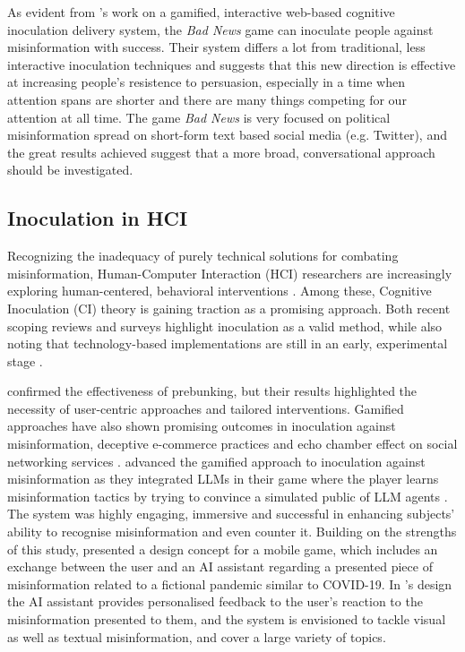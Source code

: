 \documentclass[sigconf]{acmart}
\begin{document}
As evident from \citet{Roozenbeek_VanDerLinden_2019}'s work on a gamified, interactive web-based cognitive inoculation delivery system, the \textit{Bad News} game can inoculate people against misinformation with success. Their system differs a lot from traditional, less interactive inoculation techniques and suggests that this new direction is effective at increasing people's resistence to persuasion, especially in a time when attention spans are shorter and there are many things competing for our attention at all time. The game \textit{Bad News} is very focused on political misinformation spread on short-form text based social media (e.g. Twitter), and the great results achieved suggest that a more broad, conversational approach should be investigated.

\subsection{Inoculation in HCI}

Recognizing the inadequacy of purely technical solutions for combating misinformation, Human-Computer Interaction (HCI) researchers are increasingly exploring human-centered, behavioral interventions \cite{Konstantinou_Karapanos_2025}. Among these, Cognitive Inoculation (CI) theory is gaining traction as a promising approach. Both recent scoping reviews and surveys highlight inoculation as a valid method, while also noting that technology-based implementations are still in an early, experimental stage \cite{Konstantinou_Karapanos_2025, Fard_Lingeswaran_2020}.

\citeauthor{Barman_Conlan_2024} confirmed the effectiveness of prebunking, but their results highlighted the necessity of user-centric approaches and tailored interventions. 
Gamified approaches have also shown promising outcomes in inoculation against misinformation\cite{Basol_Roozenbeek_VanDerLinden_2020}, deceptive e-commerce practices \cite{Aung_Soubutts_Singh_2024} and echo chamber effect on social networking services \cite{Jeon_Kim_Xiong_Lee_Han_2021}. \citeauthor{Tang_Sergeeva_2025} advanced the gamified approach to inoculation against misinformation as they integrated LLMs in their game where the player learns misinformation tactics by trying to convince a simulated public of LLM agents \cite{Tang_Sergeeva_2025}. 
The system was highly engaging, immersive and successful in enhancing subjects' ability to recognise misinformation and even counter it. Building on the strengths of this study, \citet{Tang_Sergeeva_2025} presented a design concept for a mobile game, which includes an exchange between the user and an AI assistant regarding a presented piece of misinformation related to a fictional pandemic similar to COVID-19. 
In \citeauthor{Tang_Sergeeva_2025}'s design the AI assistant provides personalised feedback to the user's reaction to the misinformation presented to them, and the system is envisioned to tackle visual as well as textual misinformation, and cover a large variety of topics.
\end{document}
